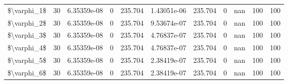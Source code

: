 \begin{tabular}{lrrrrrrrrrr}
 \$\textbackslash{}varphi\_1\$ &  30 & 6.35359e-08 & 0        &    235.704  &    1.43051e-06 &     235.704  &     0        &         nan & 100           & 100           \\
 \$\textbackslash{}varphi\_2\$ &  30 & 6.35359e-08 & 0        &    235.704  &    9.53674e-07 &     235.704  &     0        &         nan & 100           & 100           \\
 \$\textbackslash{}varphi\_3\$ &  30 & 6.35359e-08 & 0        &    235.704  &    4.76837e-07 &     235.704  &     0        &         nan & 100           & 100           \\
 \$\textbackslash{}varphi\_4\$ &  30 & 6.35359e-08 & 0        &    235.704  &    4.76837e-07 &     235.704  &     0        &         nan & 100           & 100           \\
 \$\textbackslash{}varphi\_5\$ &  30 & 6.35359e-08 & 0        &    235.704  &    2.38419e-07 &     235.704  &     0        &         nan & 100           & 100           \\
 \$\textbackslash{}varphi\_6\$ &  30 & 6.35359e-08 & 0        &    235.704  &    2.38419e-07 &     235.704  &     0        &         nan & 100           & 100           \\
\hline
\end{tabular}
